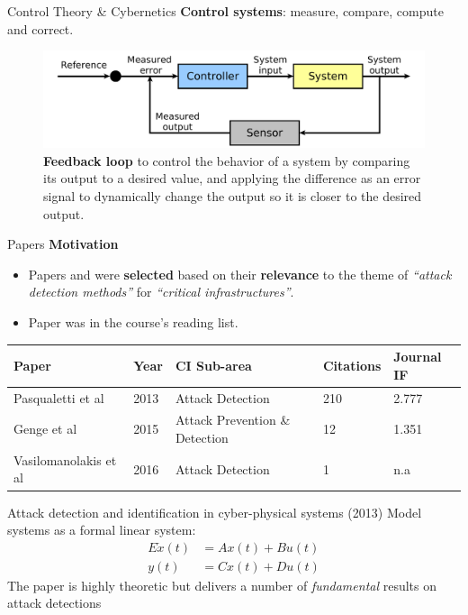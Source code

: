 \documentclass[compress]{beamer}
\begin{document}
\begin{frame}{Control Theory \& Cybernetics}
    \textbf{Control systems}: measure, compare, compute and correct.
    \begin{figure}
    \centering\tiny
    \includegraphics[width=1.0\textwidth]{./images/control-theory.png}
    \caption{\textbf{Feedback loop} to control the behavior of a system by comparing its output to a desired value, and applying the difference as an error signal to dynamically change the output so it is closer to the desired output.}
    \label{fig:control-theory}
    \end{figure}
\end{frame}
\begin{frame}{Papers}
    \textbf{Motivation}
    \begin{itemize}
     \item Papers \cite{pasqualetti2013attack} and \cite{genge2015system} were \textbf{selected} based on their \textbf{relevance} to the theme of \textit{``attack detection methods''} for \textit{``critical infrastructures''}.
     \item Paper \cite{vasilo2016multi} was in the course's reading list.

    \end{itemize}
    \begin{table}\tiny
	\begin{tabular}{|l|l|l|l|l|}
	\hline
	\textbf{Paper} & \textbf{Year} & \textbf{CI Sub-area} & \textbf{Citations} & \textbf{Journal IF}\\
	\hline \hline
	Pasqualetti et al \cite{pasqualetti2013attack} & 2013 & Attack Detection & 210 & 2.777\\
	Genge et al \cite{genge2015system} & 2015 & Attack Prevention \& Detection & 12 & 1.351\\
	Vasilomanolakis et al \cite{vasilo2016multi} & 2016 & Attack Detection & 1 & n.a \\
	\hline
	\end{tabular}
    \end{table}
\end{frame}
\begin{frame}{Attack detection and identification in cyber-physical systems
    (2013)}
    Model systems as a formal linear system:
    \begin{equation}
        \begin{split}
            E \dot x(t)&=Ax(t)+Bu(t) \\
            y(t)&=Cx(t)+Du(t)
        \end{split}
        \label{}
    \end{equation}
    The paper is highly theoretic but delivers a number of \emph{fundamental}
    results on attack detections

\end{frame}
\end{document}
